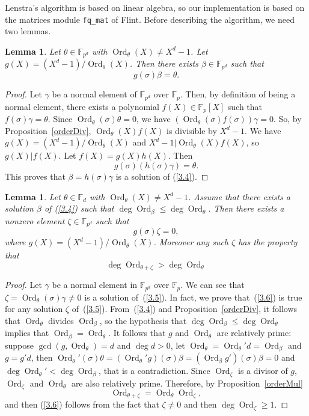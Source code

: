 \documentclass[a4paper,11pt]{article}
\theoremstyle{break}
\newtheorem{lm}[thm]{Lemma}
\theoremstyle{sc}
\theoremstyle{definition}
\theoremstyle{remark}
\DeclareMathOperator{\Ord}{Ord}
\begin{document}
Lenstra's algorithm is based on linear algebra, so our implementation is based
on the matrices module \texttt{fq\_mat} of Flint. Before describing the
algorithm, we need two lemmas. 
\begin{lm}
  \label{lmExist}
  Let $\theta\in\mathbb{F}_{p^d}$ with $\Ord_\theta(X)\neq X^d-1$. Let
  $g(X)=(X^d-1)/\Ord_\theta(X)$. Then there exists
  $\beta\in\mathbb{F}_{p^d}$ such that
  \begin{equation}
    g(\sigma)\beta=\theta.
    \label{3.4}
  \end{equation}
\end{lm}
\begin{proof}
  Let $\gamma$ be a normal element of $\mathbb{F}_{p^d}$ over
  $\mathbb{F}_p$. Then, by definition of being a normal element, there
  exists a polynomial $f(X)\in\mathbb{F}_{p}[X]$ such that
  $f(\sigma)\gamma=\theta$. Since $\Ord_\theta(\sigma)\theta=0$, we have
  $(\Ord_\theta(\sigma)f(\sigma))\gamma=0$. So, by
  Proposition~\ref{orderDiv}, $\Ord_\theta(X)f(X)$ is
  divisible by $X^d-1$. We have $g(X)=(X^d-1)/\Ord_\theta(X)$ and $X^d-1|\Ord_\theta(X)f(X)$, so
$g(X)|f(X)$. Let $f(X)=g(X)h(X)$. Then
\[
  g(\sigma)(h(\sigma)\gamma)=\theta.
\]
This proves that $\beta=h(\sigma)\gamma$ is a solution of (\ref{3.4}).
\end{proof}
\begin{lm}
  \label{lmDegree}
  Let $\theta\in\mathbb{F}_{d}$ with $\Ord_\theta(X)\neq X^d-1$. Assume
  that there exists a solution $\beta$ of (\ref{3.4}) such that
  $\deg\Ord_{\beta}\leq\deg\Ord_{\theta}$. Then there exists a nonzero
  element $\zeta\in\mathbb{F}_{p^d}$ such that 
  \begin{equation}
    g(\sigma)\zeta=0,
    \label{3.5}
  \end{equation}
  where $g(X)=(X^d-1)/\Ord_\theta(X)$. Moreover any such $\zeta$ has the
  property that
  \begin{equation}
    \deg\Ord_{\theta+\zeta}>\deg\Ord_\theta
    \label{3.6}
  \end{equation}
\end{lm}
\begin{proof}
  Let $\gamma$ be a normal element in $\mathbb{F}_{p^d}$ over
  $\mathbb{F}_p$. We can see that
  $\zeta=\Ord_\theta(\sigma)\gamma\neq0$ is a solution of~(\ref{3.5}). In
  fact, we prove that~(\ref{3.6}) is true for any solution $\zeta$
  of~(\ref{3.5}). From~(\ref{3.4}) and Proposition~\ref{orderDiv}, it follows
  that $\Ord_\theta$ divides $\Ord_\beta$, so the hypothesis that
  $\deg\Ord_\beta\leq\deg\Ord_\theta$ implies that
  $\Ord_\beta=\Ord_\theta$. It follows that $g$ and $\Ord_\theta$ are relatively
  prime: suppose $\gcd(g, \Ord_\theta)=d$ and $\deg d>0$, let
  $\Ord_\theta=\Ord_\theta'd=\Ord_\beta$ and $g=g'd$, then
  $\Ord_\theta'(\sigma)\theta=(\Ord_\theta'
  g)(\sigma)\beta=(\Ord_\beta g')(\sigma)\beta=0$ and
  $\deg\Ord_\theta'<\deg\Ord_\beta$,
  that is a contradiction. Since $\Ord_\zeta$ is a divisor of $g$,
  $\Ord_\zeta$ and $\Ord_\theta$ are also relatively prime. Therefore,
  by Proposition~\ref{orderMul}
  \[
    \Ord_{\theta+\zeta}=\Ord_\theta\Ord_\zeta,
  \]
  and then (\ref{3.6}) follows from the fact that $\zeta\neq0$ and then
  $\deg\Ord_\zeta\geq1$.
\end{proof}
\end{document}
